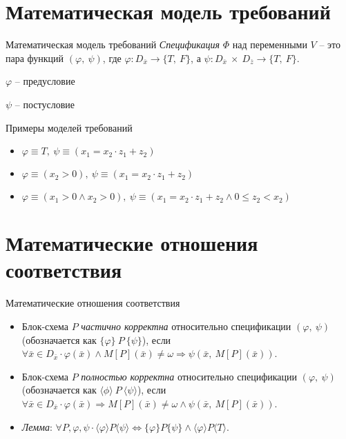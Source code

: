 \documentclass{beamer}
\begin{document}
	\section{Математическая модель требований}

	\begin{frame}{Математическая модель требований}
	\emph{Спецификация} $\Phi$ над переменными $V$ -- это пара функций $(\varphi,~\psi)$, где
		$\varphi : D_{\bar{x}} \rightarrow \{T,~F\}$, а
		$\psi : D_{\bar{x}}~\times~D_{\bar{z}} \rightarrow \{T,~F\}$.

	$\varphi$ -- предусловие

	$\psi$ -- постусловие
	\end{frame}

	\begin{frame}{Примеры моделей требований}
	\begin{itemize}
		\item $\varphi \equiv T,~\psi \equiv (x_1 = x_2 \cdot z_1 + z_2)$
		\item $\varphi \equiv (x_2 > 0),~\psi \equiv (x_1 = x_2 \cdot z_1 + z_2)$
		\item $\varphi \equiv (x_1 > 0 \wedge x_2 > 0),~\psi \equiv (x_1 = x_2 \cdot z_1 + z_2 \wedge 0 \leq z_2 < x_2)$
	\end{itemize}
	\end{frame}

	\section{Математические отношения соответствия}

	\begin{frame}{Математические отношения соответствия}

	\begin{itemize}
	\item Блок-схема $P$ \emph{частично корректна} относительно спецификации $(\varphi,~\psi)$
	(обозначается как $\{\varphi\}~P~\{\psi\}$), если $\forall \bar{x} \in D_{\bar{x}} \cdot
		\varphi(\bar{x}) \wedge M[P](\bar{x}) \neq \omega
		\Rightarrow
		\psi(\bar{x},~M[P](\bar{x}))$.

	\item Блок-схема $P$ \emph{полностью корректна} относительно спецификации $(\varphi,~\psi)$
	(обозначается как $\langle\phi\rangle~P~\langle\psi\rangle$), если $\forall \bar{x} \in D_{\bar{x}} \cdot
		\varphi(\bar{x})
		\Rightarrow
		M[P](\bar{x}) \neq \omega \wedge \psi(\bar{x},~M[P](\bar{x}))$.

	\item \emph{Лемма}: $\forall P, \varphi, \psi \cdot
				\langle\varphi\rangle P \langle\psi\rangle
				\Leftrightarrow
				\{\varphi\} P \{\psi\} \wedge \langle\varphi\rangle P \langle T \rangle$.

	\end{itemize}
	\end{frame}
\end{document}
